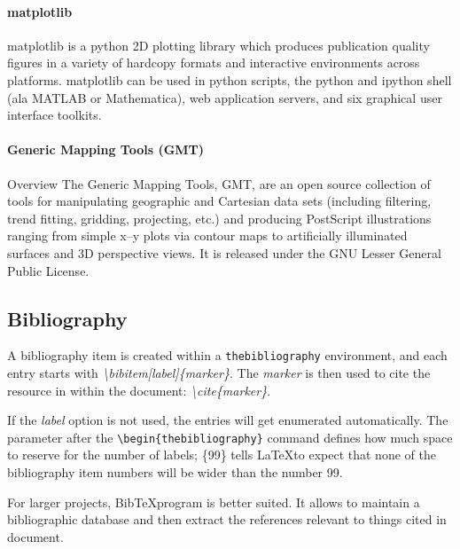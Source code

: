 \documentclass[10pt, a4paper]{article}
\begin{document}
\paragraph{matplotlib}
matplotlib is a python 2D plotting library which produces publication quality figures in a variety of hardcopy formats and interactive environments across platforms. matplotlib can be used in python scripts, the python and ipython shell (ala MATLAB or Mathematica), web application servers, and six graphical user interface toolkits.
\paragraph{Generic Mapping Tools (GMT)} Overview
The Generic Mapping Tools, GMT, are an open source collection of tools for manipulating geographic and Cartesian data sets (including filtering, trend fitting, gridding, projecting, etc.) and producing PostScript illustrations ranging from simple x–y plots via contour maps to artificially illuminated surfaces and 3D perspective views. It is released under the GNU Lesser General Public License.
\subsection{Bibliography}
A bibliography item is created within a \texttt{thebibliography} environment, and each entry starts with \emph{\textbackslash bibitem[label]\{marker\}}. The \emph{marker} is then used to cite the resource in within the document: \emph{\textbackslash cite\{marker\}}.

If the \emph{label} option is not used, the entries will get enumerated automatically. The parameter after the \texttt{\textbackslash begin\{thebibliography\}} command defines how much space to reserve for the number of labels; \{99\} tells \LaTeX to expect that none of the bibliography item numbers will be wider than the number 99. 

For larger projects, Bib\TeX program is better suited. It allows to maintain a bibliographic database and then extract the references relevant to things cited in document. 
\end{document}
